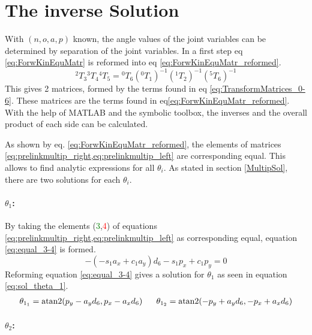 \section{The inverse Solution} \label{InverseSol}
With $ (n,o,a,p) $ known, the angle values of the joint variables can be determined by separation of the joint variables. 
In a first step \ac{eq} \ref{eq:ForwKinEquMatr} is reformed into \ac{eq} \ref{eq:ForwKinEquMatr_reformed}.
\begin{equation}\label{eq:ForwKinEquMatr_reformed}
	\phantom{}^2T_3\phantom{}^3T_4\phantom{}^4T_5 = \phantom{}^0T_6(\phantom{}^0T_1)^{-1}(\phantom{}^1T_2)^{-1}(\phantom{}^5T_6)^{-1}
\end{equation}
This gives 2 matrices, formed by the terms found in eq \ref{eq:TransformMatrices_0-6}. These matrices are the terms found in \ac{eq}\ref{eq:ForwKinEquMatr_reformed}.
With the help of MATLAB and the symbolic toolbox, the inverses and the overall product of each side can be calculated. %

	


As shown by eq. \ref{eq:ForwKinEquMatr_reformed}, the elements of matrices \cref{eq:prelinkmultip_right,eq:prelinkmultip_left} are corresponding equal. This allows to find analytic expressions for all $\theta_i$. As stated in section \ref{MultipSol}, there are two solutions for each $\theta_i$.
\medskip


\paragraph{$\theta_1$:}

By taking the elements (\textcolor{green}{3},\textcolor{red}{4}) of equations \cref{eq:prelinkmultip_right,eq:prelinkmultip_left} as corresponding equal, equation \ref{eq:equal_3-4} is formed.
\begin{equation}\label{eq:equal_3-4}
	-(-s_1a_x + c_1 a_y )d_6 - s_1 p_x +c_1 p_y = 0
\end{equation}
Reforming equation \ref{eq:equal_3-4} gives a solution for $\theta_1$ as seen in equation \ref{eq:sol_theta_1}.
\begin{multline}\label{eq:sol_theta_1}
	\theta_{1_1} = \operatorname{atan2} ( p_y - a_y d_6 , p_x - a_x d_6) 
	\phantom{......}
	\theta_{1_2} = \operatorname{atan2} (-p_y + a_y d_6 ,-p_x + a_x d_6) 
\end{multline}
\medskip

\paragraph{$\theta_2$:}

